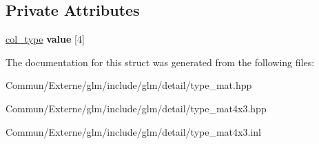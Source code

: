\subsection*{Private Attributes}
\begin{DoxyCompactItemize}
\item 
\hyperlink{structglm_1_1detail_1_1tvec3}{col\+\_\+type} {\bfseries value} \mbox{[}4\mbox{]}\hypertarget{structglm_1_1detail_1_1tmat4x3_adf38c933bb2229017518d0d50693885e}{}\label{structglm_1_1detail_1_1tmat4x3_adf38c933bb2229017518d0d50693885e}

\end{DoxyCompactItemize}


The documentation for this struct was generated from the following files\+:\begin{DoxyCompactItemize}
\item 
Commun/\+Externe/glm/include/glm/detail/type\+\_\+mat.\+hpp\item 
Commun/\+Externe/glm/include/glm/detail/type\+\_\+mat4x3.\+hpp\item 
Commun/\+Externe/glm/include/glm/detail/type\+\_\+mat4x3.\+inl\end{DoxyCompactItemize}

